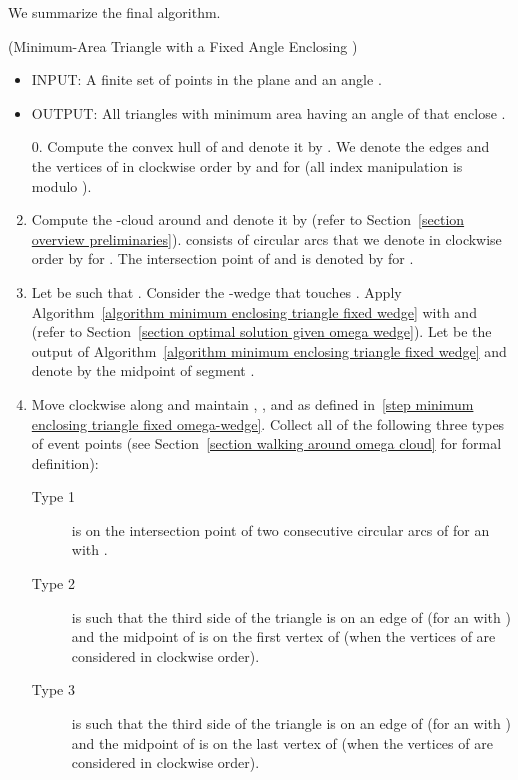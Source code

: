 \documentclass[11pt, oneside]{article}
\begin{document}
We summarize the final algorithm.
\begin{algorithm}(Minimum-Area Triangle with a Fixed Angle Enclosing )
\label{algorithm minimum enclosing triangle fixed angle}
\begin{itemize}
\item INPUT: A finite set  of points in the plane
and an angle .

\item OUTPUT: All triangles with minimum area 
having an angle of 
that enclose .
\end{itemize}
\begin{enumerate}
\item[0.] Compute the convex hull of  and denote it by .
We denote the edges and the vertices of 
in clockwise order 
by  and  for 
(all index manipulation is modulo ).

\item Compute the -cloud around 
and denote it by 
(refer to Section~\ref{section overview preliminaries}).
 consists of  circular arcs
that we denote in clockwise order by  for .
The intersection point of  and  
is denoted by  for .

\item\label{step minimum enclosing triangle fixed omega-wedge}  
Let  be such that .
Consider the -wedge  
that touches .
Apply Algorithm~\ref{algorithm minimum enclosing triangle fixed wedge}
with  and 
(refer to Section~\ref{section optimal solution given omega wedge}).
Let  be the output 
of Algorithm~\ref{algorithm minimum enclosing triangle fixed wedge}
and denote by  the midpoint of segment .

\item\label{step event points} 
Move  clockwise along 
and maintain , ,  and 
as defined in~\ref{step minimum enclosing triangle fixed omega-wedge}.
Collect all of the following three types of event points
(see Section~\ref{section walking around omega cloud}
for formal definition):
\begin{description}
\item[Type 1]
 is on the intersection point of two consecutive circular arcs of  
for an  with .

\item[Type 2]
 is such that the third side  of the triangle
is on an edge  of 
(for an  with )
and the midpoint  of 
is on the first vertex  of 
(when the vertices of  are considered in clockwise order).

\item[Type 3]
 is such that the third side  of the triangle
is on an edge  of 
(for an  with )
and the midpoint  of 
is on the last vertex  of 
(when the vertices of  are considered in clockwise order).
\end{description}


\end{enumerate}
\end{algorithm}
\end{document}
